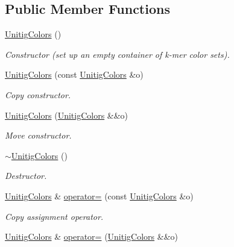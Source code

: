 \subsection*{Public Member Functions}
\begin{DoxyCompactItemize}
\item 
\mbox{\label{classUnitigColors_aec10fe1eb0e2a6dc50d49e2a104e24cb}} 
\hyperlink{classUnitigColors_aec10fe1eb0e2a6dc50d49e2a104e24cb}{Unitig\+Colors} ()
\begin{DoxyCompactList}\small\item\em Constructor (set up an empty container of k-\/mer color sets). \end{DoxyCompactList}\item 
\hyperlink{classUnitigColors_af5accc6ad5fdeab9aeae11bb8af9fd9f}{Unitig\+Colors} (const \hyperlink{classUnitigColors}{Unitig\+Colors} \&o)
\begin{DoxyCompactList}\small\item\em Copy constructor. \end{DoxyCompactList}\item 
\hyperlink{classUnitigColors_a3c8668fa0cb7ea4ff68cf61e2e7fff91}{Unitig\+Colors} (\hyperlink{classUnitigColors}{Unitig\+Colors} \&\&o)
\begin{DoxyCompactList}\small\item\em Move constructor. \end{DoxyCompactList}\item 
\mbox{\label{classUnitigColors_af0b4c187dcb539a57bc39c924af8de54}} 
\hyperlink{classUnitigColors_af0b4c187dcb539a57bc39c924af8de54}{$\sim$\+Unitig\+Colors} ()
\begin{DoxyCompactList}\small\item\em Destructor. \end{DoxyCompactList}\item 
\hyperlink{classUnitigColors}{Unitig\+Colors} \& \hyperlink{classUnitigColors_a2c86fc45efad798e190efe4924b623b1}{operator=} (const \hyperlink{classUnitigColors}{Unitig\+Colors} \&o)
\begin{DoxyCompactList}\small\item\em Copy assignment operator. \end{DoxyCompactList}\item 
\hyperlink{classUnitigColors}{Unitig\+Colors} \& \hyperlink{classUnitigColors_acbd4042c11f8d3c8faa47e42b38cfd90}{operator=} (\hyperlink{classUnitigColors}{Unitig\+Colors} \&\&o)

\end{DoxyCompactItemize}
